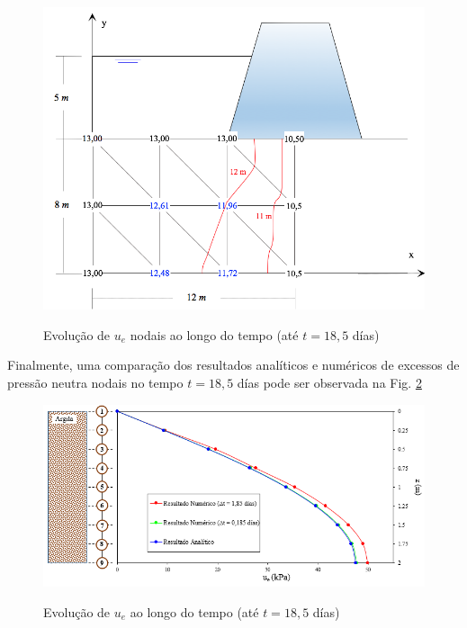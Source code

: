 \documentclass{article} %
\begin{document}
\begin{figure}[H]
	\centering
	\caption{Evolução de \(u_e\) nodais ao longo do tempo (até \(t=18,5\) días)}
	\includegraphics[width=1\linewidth]{result}	
	\label{result}	
\end{figure}
 Finalmente, uma comparação dos resultados analíticos e numéricos de excessos de pressão neutra nodais no tempo \(t=18,5\) días pode ser observada na Fig. \ref{comparacion}
\begin{figure}[H]
	\centering
	\caption{Evolução de \(u_e\) ao longo do tempo (até \(t=18,5\) días)}
	\includegraphics[width=1\linewidth]{comparacion}	
	\label{comparacion}	
\end{figure}




%
%
\end{document}
